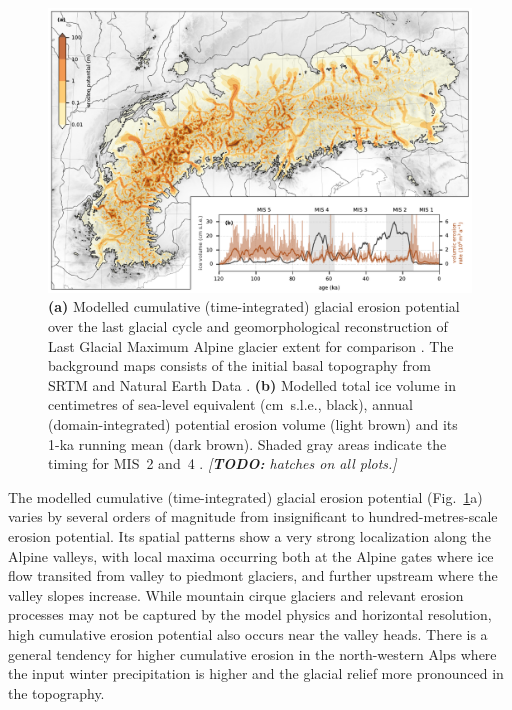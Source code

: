 \documentclass[esurf, manuscript]{copernicus}
\newcommand{\todo}[1]{\textcolor{Rd}{\emph{[\textbf{TODO:} #1]}}}
\begin{document}
    \begin{figure}
      \centerline{\includegraphics{alpero_cumulative}}
      \caption{%
        \textbf{(a)} Modelled cumulative (time-integrated) glacial erosion
          potential over the last glacial cycle and geomorphological
          reconstruction of Last Glacial Maximum Alpine glacier extent for
          comparison \citep[solid red line,][]{Ehlers.etal.2011}.
          The background maps consists of the initial basal topography from
          SRTM \citep{Jarvis.etal.2008} and Natural Earth Data
          \citep{Patterson.Kelso.2017}.
        \textbf{(b)} Modelled total ice volume in centimetres of sea-level
          equivalent (cm~s.l.e., black), annual (domain-integrated) potential
          erosion volume (light brown) and its 1-ka running mean (dark brown).
          Shaded gray areas indicate the timing for MIS~2 and~4
          \citep{Lisiecki.Raymo.2005}.
        \todo{hatches on all plots.}}
        \label{fig:cumulative}
    \end{figure}

    The modelled cumulative (time-integrated) glacial erosion potential
    (Fig.~\ref{fig:cumulative}a) varies by several orders of magnitude
    from insignificant to hundred-metres-scale erosion potential. Its spatial
    patterns show a very strong localization along the Alpine valleys, with
    local maxima occurring both at
    the Alpine gates where ice flow transited from valley to piedmont glaciers,
    and further upstream where the valley slopes increase. While mountain
    cirque glaciers and relevant erosion processes may not be captured by the
    model physics and horizontal resolution, high
    cumulative erosion potential also occurs near the valley heads.
    There is a general tendency for higher cumulative erosion in the
    north-western Alps where the input winter precipitation is higher
    \citep[WorldClim, Fig.~1h in][]{Seguinot.etal.2018} and the glacial relief
    more pronounced in the topography.
\end{document}
